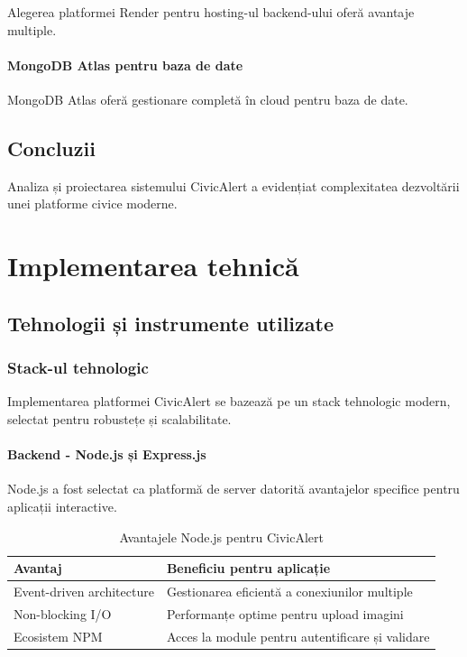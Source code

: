 \documentclass[12pt,a4paper]{report}
\begin{document}
Alegerea platformei Render pentru hosting-ul backend-ului oferă avantaje multiple.

\subsubsection{MongoDB Atlas pentru baza de date}

MongoDB Atlas oferă gestionare completă în cloud pentru baza de date.

\section{Concluzii}

Analiza și proiectarea sistemului CivicAlert a evidențiat complexitatea dezvoltării unei platforme civice moderne.

\newpage
\chapter{Implementarea tehnică}

\section{Tehnologii și instrumente utilizate}

\subsection{Stack-ul tehnologic}

Implementarea platformei CivicAlert se bazează pe un stack tehnologic modern, selectat pentru robustețe și scalabilitate.

\subsubsection{Backend - Node.js și Express.js}

Node.js a fost selectat ca platformă de server datorită avantajelor specifice pentru aplicații interactive.

\begin{table}[H]
\centering
\caption{Avantajele Node.js pentru CivicAlert}
\label{tab:nodejs_advantages}
\begin{tabular}{|p{4cm}|p{8cm}|}
\hline
\textbf{Avantaj} & \textbf{Beneficiu pentru aplicație} \\
\hline
Event-driven architecture & Gestionarea eficientă a conexiunilor multiple \\
\hline
Non-blocking I/O & Performanțe optime pentru upload imagini \\
\hline
Ecosistem NPM & Acces la module pentru autentificare și validare \\
\hline
\end{tabular}
\end{table}
\end{document}
